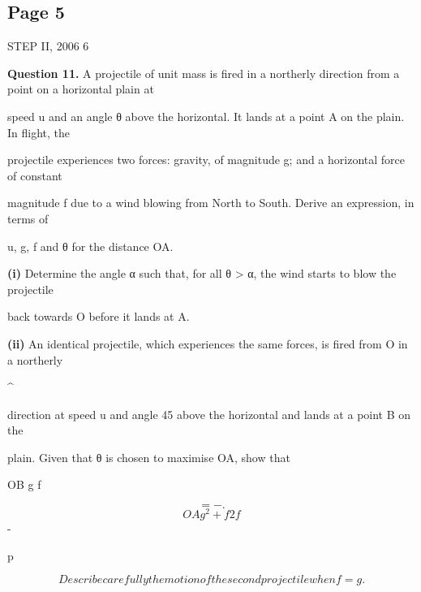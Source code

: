 \documentclass[12pt]{article}
\begin{document}
\subsection*{Page 5}
\begin{flushleft}
STEP II, 2006 6\par
\bigskip\textbf{Question 11.} A projectile of unit mass is fired in a northerly direction from a point on a horizontal plain at\par
speed u and an angle θ above the horizontal. It lands at a point A on the plain. In flight, the\par
projectile experiences two forces: gravity, of magnitude g; and a horizontal force of constant\par
magnitude f due to a wind blowing from North to South. Derive an expression, in terms of\par
u, g, f and θ for the distance OA.\par
\textbf{(i)} Determine the angle α such that, for all θ > α, the wind starts to blow the projectile\par
back towards O before it lands at A.\par
\textbf{(ii)} An identical projectile, which experiences the same forces, is fired from O in a northerly\par
\textasciicircum{}\circ\par
direction at speed u and angle 45 above the horizontal and lands at a point B on the\par
plain. Given that θ is chosen to maximise OA, show that\par
OB g f\par
\[= - .\]
\[OA g^2 + f 2 f\]
-\par
p\par
\[Describe carefully the motion of the second projectile when f = g.\]
\end{flushleft}
\end{document}
